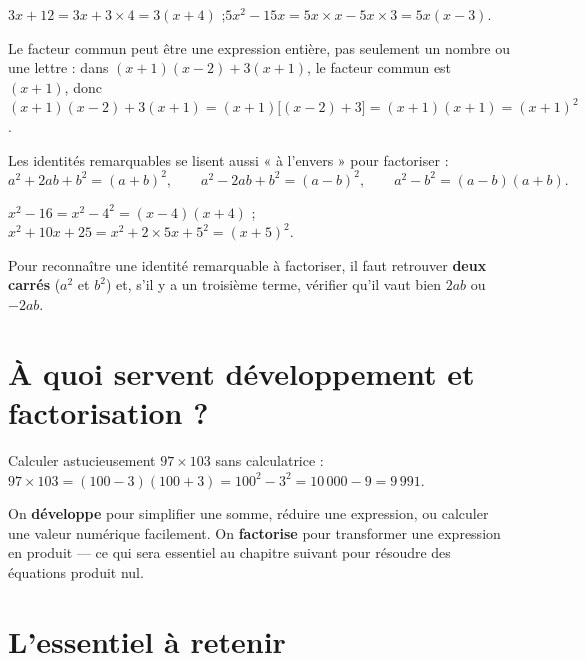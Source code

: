 \begin{exemple}
$3x+12=3x+3\times4=3(x+4)$ ;\quad $5x^{2}-15x=5x\times x-5x\times3=5x(x-3)$.
\end{exemple}

\begin{remarque}
Le facteur commun peut être une expression entière, pas seulement un nombre ou une lettre :
dans $(x+1)(x-2)+3(x+1)$, le facteur commun est $(x+1)$, donc
$(x+1)(x-2)+3(x+1)=(x+1)\big[(x-2)+3\big]=(x+1)(x+1)=(x+1)^{2}$.
\end{remarque}

\begin{propriete}
Les identités remarquables se lisent aussi « à l'envers » pour factoriser :
\[
a^{2}+2ab+b^{2}=(a+b)^{2}, \qquad a^{2}-2ab+b^{2}=(a-b)^{2}, \qquad a^{2}-b^{2}=(a-b)(a+b).
\]
\end{propriete}

\begin{exemple}
$x^{2}-16=x^{2}-4^{2}=(x-4)(x+4)$ ;\quad $x^{2}+10x+25=x^{2}+2\times5x+5^{2}=(x+5)^{2}$.
\end{exemple}

\begin{aretenir}
Pour reconnaître une identité remarquable à factoriser, il faut retrouver \textbf{deux
carrés} ($a^{2}$ et $b^{2}$) et, s'il y a un troisième terme, vérifier qu'il vaut bien
$2ab$ ou $-2ab$.
\end{aretenir}

\section{À quoi servent développement et factorisation ?}

\begin{exemple}
Calculer astucieusement $97\times103$ sans calculatrice : $97\times103=(100-3)(100+3)=100^{2}-3^{2}=10\,000-9=9\,991$.
\end{exemple}

\begin{aretenir}
On \textbf{développe} pour simplifier une somme, réduire une expression, ou calculer une
valeur numérique facilement. On \textbf{factorise} pour transformer une expression en produit
— ce qui sera essentiel au chapitre suivant pour résoudre des équations produit nul.
\end{aretenir}

\section{L'essentiel à retenir}


